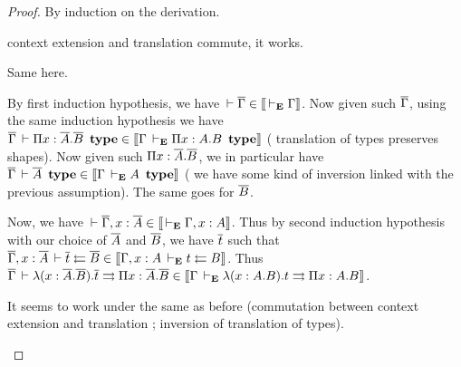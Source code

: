 \begin{proof}
  By induction on the derivation.
  \begin{caselist}
    \nextcase
    \begin{mathpar}
    \end{mathpar}
     context extension and translation commute, it works.

    \nextcase
    \begin{mathpar}
    \end{mathpar}
    Same here.

    \nextcase
    \begin{mathpar}
    \end{mathpar}
    By first induction hypothesis, we have $\der \barG \in \den{\dere \Gamma}$.
    Now given such $\barG$, using the same induction hypothesis we have
    $\barG \der \Pi x:\barA.\barB\ \type
    \in \den{\Gamma \dere \Pi x:A.B\ \type}$
    ( translation of types preserves shapes).
    Now given such $\Pi x:\barA.\barB$, we in particular have
    $\barG \der \barA\ \type \in \den{\Gamma \dere A\ \type}$
    ( we have some kind of inversion linked with the previous
    assumption). The same goes for $\barB$.

    Now, we have $\der \barG, x:\barA \in \den{\dere \Gamma, x:A}$.
    Thus by second induction hypothesis with our choice of $\barA$ and
    $\barB$, we have $\bart$ such that
    $\barG, x:\barA \der \bart \checks \barB \in
    \den{\Gamma, x:A \dere t \checks B}$.
    Thus $\barG \der \lambda (x:\barA.\barB).\bart \infers \Pi x:\barA.\barB
    \in \den{\Gamma \dere \lambda (x:A.B).t \infers \Pi x:A.B}$.

    \nextcase
    \begin{mathpar}
    \end{mathpar}

    \nextcase
    \begin{mathpar}
    \end{mathpar}
    It seems to work under the same  as before (commutation
    between context extension and translation ; inversion of translation of
    types).


\end{caselist}
\end{proof}
